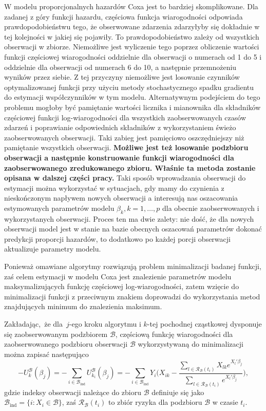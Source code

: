 W modelu proporcjonalnych hazardów Coxa jest to bardziej skomplikowane. Dla zadanej z góry funkcji hazardu, częściowa funkcja wiarogodności odpowiada prawdopodobieństwu tego, że obserwowane zdarzenia zdarzyłyby się dokładnie w tej kolejności w jakiej się pojawiły. To prawdopodobieństwo zależy od wszystkich obserwacji w zbiorze. Niemożliwe jest wyliczenie tego poprzez obliczenie wartości funkcji częściowej wiarogodności oddzielnie dla obserwacji o numerach od 1 do 5 i oddzielnie dla obserwacji od numerach 6 do 10, a następnie przemnożeniu wyników przez siebie. Z tej przyczyny niemożliwe jest losowanie czynników optymalizowanej funkcji przy użyciu metody stochastycznego spadku gradientu do estymacji współczynników w tym modelu. Alternatywnym podejściem do tego problemu mogłoby być pamiętanie wartości licznika i mianownika dla składników częściowej funkcji log-wiarogodności dla wszystkich zaobserwowanych czasów zdarzeń i poprawianie odpowiednich składników z wykorzystaniem świeżo zaobserwowanych obserwacji. Taki zabieg jest pamięciowo oszczędniejszy niż pamiętanie wszystkich obserwacji. \textbf{Możliwe jest też losowanie podzbioru obserwacji a następnie konstruowanie funkcji wiarogodności dla zaobserwowanego zredukowanego zbioru. Właśnie ta metoda zostanie opisana w dalszej części pracy.} Taki sposób wprowadzania obserwacji do estymacji można wykorzystać w sytuacjach, gdy mamy do czynienia z nieskończonym napływem nowych obserwacji a interesują nas oszacowania estymowanych parametrów modelu $\beta_k, k=1,\dots,p$ dla obecnie zaobserwowanych i wykorzystanych obserwacji. Proces ten ma dwie zalety: nie dość, że dla nowych obserwacji model jest w stanie na bazie obecnych oszacowań parametrów dokonać predykcji proporcji hazardów, to dodatkowo po każdej porcji obserwacji aktualizuje parametry modelu.

Ponieważ
omawiane algorytmy rozwiązują problem minimalizacji badanej funkcji, zaś
celem estymacji w modelu Coxa jest znalezienie parametrów modelu
maksymalizujących funkcję częściowej log-wiarogodności, zatem wzięcie do
minimalizacji funkcji z przeciwnym znakiem doprowadzi do wykorzystania
metod znajdujących minimum do znalezienia maksimum. 

Zakładając,~że dla~\(j\)-ego kroku
algorytmu i \(k\)-tej pochodnej cząstkowej dysponuje się zaobserwowanym podzbiorem
\(\mathcal{B}\), częściową funkcję wiarogodności dla zaobserwowanego podzbioru obserwacji \(\mathcal{B}\) wykorzystywaną do minimalizacji można zapisać następująco
\begin{equation}
-U^\mathcal{B}_k(\beta_j)=-\sum\limits_{i \in \mathcal{B}_\text{ind}}^{}U^\mathcal{B}_{k_{i}}(\beta_j)=-\sum\limits_{i \in \mathcal{B}_\text{ind}}^{}Y_i\Big(X_{ik}-\dfrac{\sum\limits_{l\in \mathscr{R}_\mathcal{B}(t_i)}^{} X_{lk} e^{X_l'\beta_j}}{\sum\limits_{l\in \mathscr{R}_\mathcal{B}(t_i)}^{} e^{X_l'\beta_j}}\Big),
\end{equation}
gdzie indeksy obserwacji należące do zbioru \(\mathcal{B}\) definiuje się jako
\(\mathcal{B}_{\text{ind}} = \{i: X_i \in \mathcal{B} \}\), zaś
\(\mathscr{R}_\mathcal{B}(t_i)\) to zbiór ryzyka dla podzbioru
\(\mathcal{B}\) w czasie \(t_i\).

